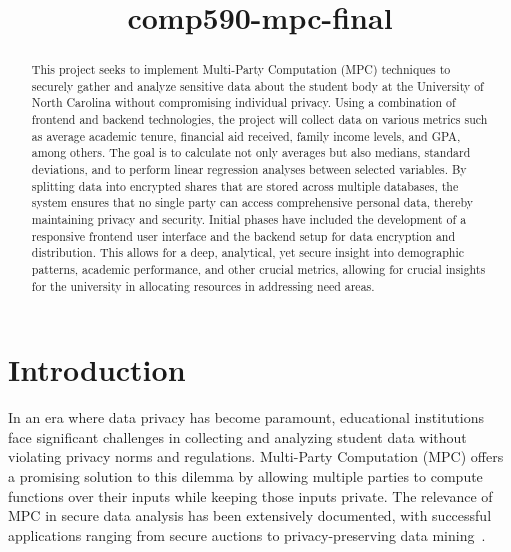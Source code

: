 \documentclass[conference]{IEEEtran}
\begin{document}
\title{comp590-mpc-final}


\author{
\and
{}
\and
{}
\and
{}
\and
{}
}

\maketitle

\begin{abstract}

This project seeks to implement Multi-Party Computation (MPC) techniques to securely gather and analyze sensitive data about the student body at the University of North Carolina without compromising individual privacy.
Using a combination of frontend and backend technologies, the project will collect data on various metrics such as average academic tenure, financial aid received, family income levels, and GPA, among others. 
The goal is to calculate not only averages but also medians, standard deviations, and to perform linear regression analyses between selected variables. 
By splitting data into encrypted shares that are stored across multiple databases, the system ensures that no single party can access comprehensive personal data, thereby maintaining privacy and security. 
Initial phases have included the development of a responsive frontend user interface and the backend setup for data encryption and distribution. 
This allows for a deep, analytical, yet secure insight into demographic patterns, academic performance, and other crucial metrics, allowing for crucial insights for the university in allocating resources in addressing need areas. 

\end{abstract}


\section{Introduction}

In an era where data privacy has become paramount, educational institutions face significant challenges in collecting and analyzing student data without violating privacy norms and regulations. Multi-Party Computation (MPC) offers a promising solution to this dilemma by allowing multiple parties to compute functions over their inputs while keeping those inputs private. The relevance of MPC in secure data analysis has been extensively documented, with successful applications ranging from secure auctions to privacy-preserving data mining~\cite{MPC1}.
\end{document}
